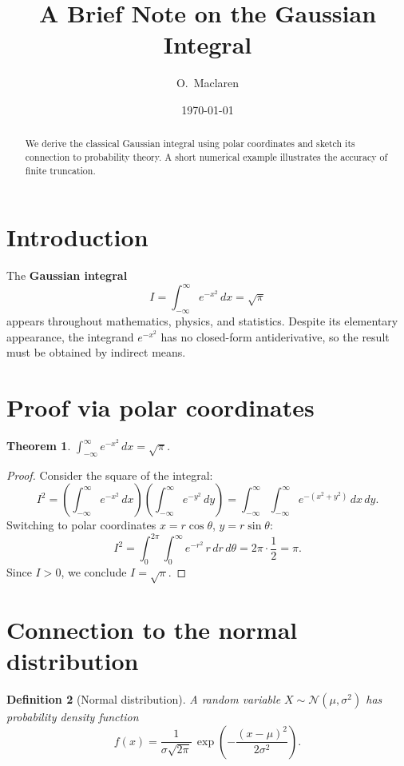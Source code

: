 \documentclass[11pt]{article}
\title{A Brief Note on the Gaussian Integral}
\author{O.\ Maclaren}
\date{\today}
\newtheorem{theorem}{Theorem}
\newtheorem{definition}[theorem]{Definition}
\begin{document}
\maketitle

\begin{abstract}
We derive the classical Gaussian integral using polar coordinates and sketch its connection to probability theory. A short numerical example illustrates the accuracy of finite truncation.
\end{abstract}

\section{Introduction}

The \textbf{Gaussian integral}
\begin{equation}\label{eq:gauss}
  I = \int_{-\infty}^{\infty} e^{-x^2}\, dx = \sqrt{\pi}
\end{equation}
appears throughout mathematics, physics, and statistics. Despite its elementary appearance, the integrand $e^{-x^2}$ has no closed-form antiderivative, so the result must be obtained by indirect means.

\section{Proof via polar coordinates}

\begin{theorem}\label{thm:main}
$\displaystyle \int_{-\infty}^{\infty} e^{-x^2}\, dx = \sqrt{\pi}$.
\end{theorem}

\begin{proof}
Consider the square of the integral:
\[
  I^2 = \left(\int_{-\infty}^{\infty} e^{-x^2}\, dx\right)
        \left(\int_{-\infty}^{\infty} e^{-y^2}\, dy\right)
      = \int_{-\infty}^{\infty}\int_{-\infty}^{\infty} e^{-(x^2+y^2)}\, dx\, dy.
\]
Switching to polar coordinates $x = r\cos\theta$, $y = r\sin\theta$:
\[
  I^2 = \int_0^{2\pi}\int_0^{\infty} e^{-r^2}\, r\, dr\, d\theta
      = 2\pi \cdot \frac{1}{2} = \pi.
\]
Since $I > 0$, we conclude $I = \sqrt{\pi}$.
\end{proof}

\section{Connection to the normal distribution}

\begin{definition}[Normal distribution]
A random variable $X \sim \mathcal{N}(\mu, \sigma^2)$ has probability density function
\begin{equation}\label{eq:normal}
  f(x) = \frac{1}{\sigma\sqrt{2\pi}}\, \exp\!\left(-\frac{(x-\mu)^2}{2\sigma^2}\right).
\end{equation}
\end{definition}
\end{document}
